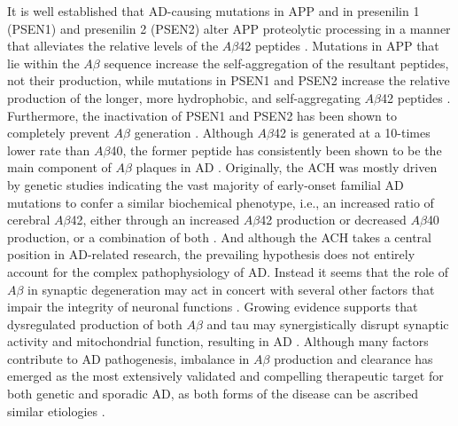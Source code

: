It is well established that AD-causing mutations in APP and in presenilin 1 (PSEN1) and presenilin 2 (PSEN2) alter APP proteolytic processing in a manner that alleviates the relative levels of the $A\beta$42 peptides \citep{Borchelt1996,Scheuner1996}. Mutations in APP that lie within the $A\beta$ sequence increase the self-aggregation of the resultant peptides, not their production, while mutations in PSEN1 and PSEN2 increase the relative production of the longer, more hydrophobic, and self-aggregating $A\beta$42 peptides \citep{Kim2008,Weggen2012}. Furthermore, the inactivation of PSEN1 and PSEN2 has been shown to completely prevent $A\beta$ generation \citep{Herreman2000,Zhang2000}. Although $A\beta$42 is generated at a 10-times lower rate than $A\beta$40, the former peptide has consistently been shown to be the main component of $A\beta$ plaques in AD \citep{Iwatsubo1994}. Originally, the ACH was mostly driven by genetic studies indicating the vast majority of early-onset familial AD mutations to confer a similar biochemical phenotype, i.e., an increased ratio of cerebral $A\beta$42, either through an increased $A\beta$42 production or decreased $A\beta$40 production, or a combination of both \citep{Cavallucci2012,Cruts1998}. And although the ACH takes a central position in AD-related research, the prevailing hypothesis does not entirely account for the complex pathophysiology of AD. Instead it seems that the role of $A\beta$ in synaptic degeneration may act in concert with several other factors that impair the integrity of neuronal functions \citep{anand2014,DalPra2015}. Growing evidence supports that dysregulated production of both $A\beta$ and tau may synergistically disrupt synaptic activity and mitochondrial function, resulting in AD \citep{Chetelat2013,Musiek2015,Quintanilla2012,Teplow2013}. Although many factors contribute to AD pathogenesis, imbalance in $A\beta$ production and clearance has emerged as the most extensively validated and compelling therapeutic target for both genetic and sporadic AD, as both forms of the disease can be ascribed similar etiologies \citep{Selkoe2012,Selkoe2016}.

